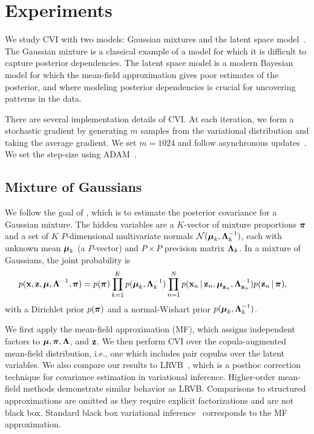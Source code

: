 \section{Experiments}
\label{sec:experiments}

We study \gls{CVI} with two models: Gaussian mixtures and the latent
space model~\citep{hoff2001latent}. The Gaussian mixture is a
classical example of a model for which it is difficult to capture
posterior dependencies. The latent space model is a modern Bayesian
model for which the mean-field approximation gives poor estimates of
the posterior, and where modeling posterior dependencies is crucial for uncovering patterns in the data.

There are several implementation details of \gls{CVI}. At each
iteration, we form a stochastic gradient by generating $m$ samples
from the variational distribution and taking the average gradient. We
set $m=1024$ and follow asynchronous updates~\citep{recht2011hogwild}. We set the step-size using ADAM~\citep{kingma2015adam}.

\subsection{Mixture of Gaussians}
\label{subsec:mixture}
We follow the goal of \citet{giordano2015linear}, which is to estimate
the posterior covariance for a Gaussian mixture. The hidden variables
are a $K$-vector of mixture proportions $\boldsymbol{\mathbf{\pi}}$ and a set of $K$
$P$-dimensional multivariate normals
$\mathcal{N}(\boldsymbol{\mathbf{\mu}}_k,\boldsymbol{\mathbf{\Lambda}}_k^{-1})$, each with unknown mean
$\boldsymbol{\mathbf{\mu}}_k$ (a $P$-vector) and $P\times P$ precision matrix
$\boldsymbol{\mathbf{\Lambda}}_k$. In a mixture of Gaussians, the joint probability is
\begin{align*}
p(\boldsymbol{\mathbf{x}}, \boldsymbol{\mathbf{z}}, \boldsymbol{\mathbf{\mu}}, \boldsymbol{\mathbf{\Lambda}}^{-1},\boldsymbol{\mathbf{\pi}})
&= p(\boldsymbol{\mathbf{\pi}})\prod_{k=1}^Kp(\boldsymbol{\mathbf{\mu}}_k,\boldsymbol{\mathbf{\Lambda}}^{-1}_k)\prod_{n=1}^N p(\boldsymbol{\mathbf{x}}_n\,|\,
\boldsymbol{\mathbf{z}}_n,\boldsymbol{\mathbf{\mu}}_{\boldsymbol{\mathbf{z}}_n},\boldsymbol{\mathbf{\Lambda}}^{-1}_{\boldsymbol{\mathbf{z}}_n})p(\boldsymbol{\mathbf{z}}_n\,|\, \boldsymbol{\mathbf{\pi}}),
\end{align*}
with a Dirichlet prior $p(\boldsymbol{\mathbf{\pi}})$ and a normal-Wishart prior
$p(\boldsymbol{\mathbf{\mu}}_k,\boldsymbol{\mathbf{\Lambda}}_k^{-1})$.

We first apply the mean-field approximation (\gls{MF}),
which assigns independent factors to $\boldsymbol{\mathbf{\mu}}, \boldsymbol{\mathbf{\pi}}, \boldsymbol{\mathbf{\Lambda}}$, and
$\boldsymbol{\mathbf{z}}$. We then perform \gls{CVI} over the copula-augmented
mean-field distribution, i.e., one which includes pair copulas over
the latent variables. We also compare our results to
\gls{LRVB}~\citep{giordano2015linear}, which is a posthoc correction
technique for covariance estimation in variational inference.
Higher-order mean-field methods demonstrate similar behavior as
\gls{LRVB}. Comparisons to structured approximations are omitted as
they require explicit factorizations and are not black box. Standard black box variational inference~\citep{ranganath2014black}
corresponds to the \gls{MF} approximation.

